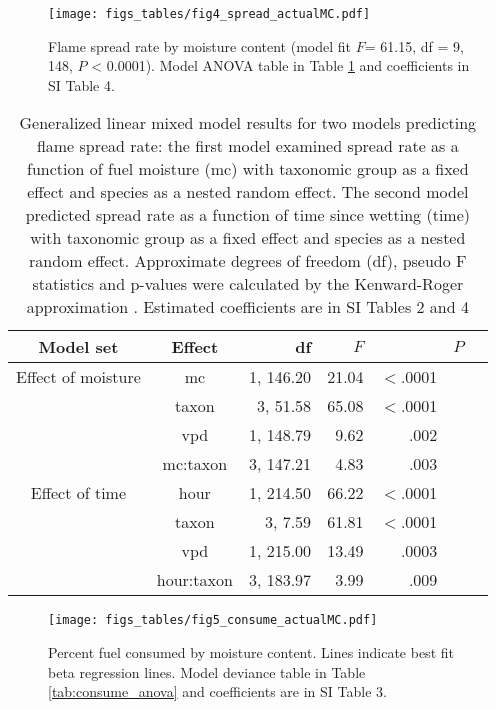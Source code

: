 \documentclass[letterpaper,12pt]{article}
\begin{document}
\begin{figure}[h]
  \centering
\texttt{[image: figs\_tables/fig4\_spread\_actualMC.pdf]}
\caption{Flame spread rate by moisture content (model fit $F$= 61.15, df = 9,
  148, $P$ < 0.0001). Model ANOVA table in Table \ref{tab:spreadrate_anova} and
  coefficients in SI Table 4.}
  \label{fig:spread_moist}
\end{figure}

\begin{table}[h]
  \caption{Generalized linear mixed model results for two models predicting
    flame spread rate: the first model examined spread rate as a function of
    fuel moisture (mc) with taxonomic group as a fixed effect and species as a
    nested random effect. The second model predicted spread rate as a function
    of time since wetting (time) with taxonomic group as a fixed effect and
    species as a nested random effect. Approximate degrees of freedom (df),
    pseudo F statistics and p-values were calculated by the Kenward-Roger
    approximation \citep{Kenward_Roger-1997}. Estimated coefficients are in SI
    Tables 2 and 4}
  \label{tab:spreadrate_anova}
  
\centering
\begin{tabular}{ccrrrrr}
  \toprule
Model set & Effect & df & $F$ & & $P$ \\
  \midrule
  Effect of moisture & mc & 1, 146.20 & 21.04 & $<$.0001 \\ 
 & taxon & 3, 51.58 & 65.08 & $<$.0001 \\ 
 & vpd & 1, 148.79 & 9.62 & .002 \\ 
 & mc:taxon & 3, 147.21 & 4.83 & .003 \\ 
   
  \midrule
  
  Effect of time & hour & 1, 214.50 & 66.22 & $<$.0001 \\ 
 &  taxon & 3, 7.59 & 61.81 & $<$.0001 \\ 
 & vpd & 1, 215.00 & 13.49 & .0003 \\ 
 & hour:taxon & 3, 183.97 & 3.99 & .009 \\ 

   \bottomrule

\end{tabular}
\end{table}

\begin{figure}[h]
  \centering
\texttt{[image: figs\_tables/fig5\_consume\_actualMC.pdf]}
\caption{Percent fuel consumed by moisture content. Lines indicate best fit
  beta regression lines. Model deviance table in Table \ref{tab:consume_anova}
  and coefficients are in SI Table 3.}
  \label{fig:consume_moist}
\end{figure}
\end{document}
